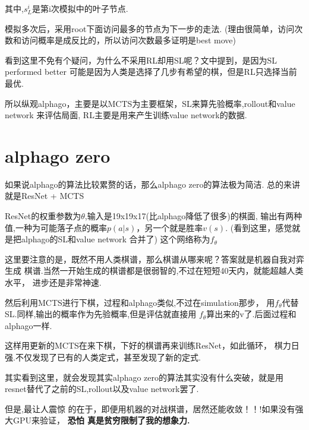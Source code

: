 \documentclass{article}
\begin{document}
\begin{enumerate}
                其中,$s_{L}^i$是第i次模拟中的叶子节点.
                
                模拟多次后，采用root下面访问最多的节点为下一步的走法.
                (理由很简单，访问次数和访问概率是成反比的，所以访问次数最多证明是best move)

                看到这里不免有个疑问，为什么不采用RL却用SL呢？文中提到，是因为SL performed better
                可能是因为人类是选择了几步有希望的棋，但是RL只选择当前最优.

                所以纵观alphago，主要是以MCTS为主要框架，SL来算先验概率,rollout和value network
                来评估局面, RL主要是用来产生训练value network的数据.

                \section{alphago zero}

                如果说alphago的算法比较累赘的话，那么alphago zero的算法极为简洁.
                总的来讲就是ResNet + MCTS 
                
                ResNet的权重参数为$\theta$,输入是19x19x17(比alphago降低了很多)的棋面,
                输出有两种值,一种为可能落子点的概率$p(a|s)$，另一个就是胜率$v(s)$.
                (看到这里，感觉就是把alphago的SL和value network 合并了)
                这个网络称为$f_\theta$

                这里要注意的是，既然不用人类棋谱，那么棋谱从哪来呢？答案就是机器自我对弈生成
                棋谱.当然一开始生成的棋谱都是很弱智的,不过在短短40天内，就能超越人类水平，
                进步还是非常神速.

                然后利用MCTS进行下棋，过程和alphago类似,不过在simulation那步，
                用$f_\theta$代替SL.同样,输出的概率作为先验概率,但是评估就直接用
                $f_\theta$算出来的v了.后面过程和alphago一样.

                这样用更新的MCTS在来下棋，下好的棋谱再来训练ResNet，如此循环，
                棋力日强.不仅发现了已有的人类定式，甚至发现了新的定式.

                其实看到这里，就会发现其实alphago zero的算法其实没有什么突破，就是用
                resnet替代了之前的SL,rollout以及value network罢了.
                
                但是,最让人震惊
                的在于，即便用机器的对战棋谱，居然还能收敛！！!如果没有强大GPU来验证，
                \textbf{恐怕
                真是贫穷限制了我的想象力.}



            \end{enumerate}

        
\end{document}

